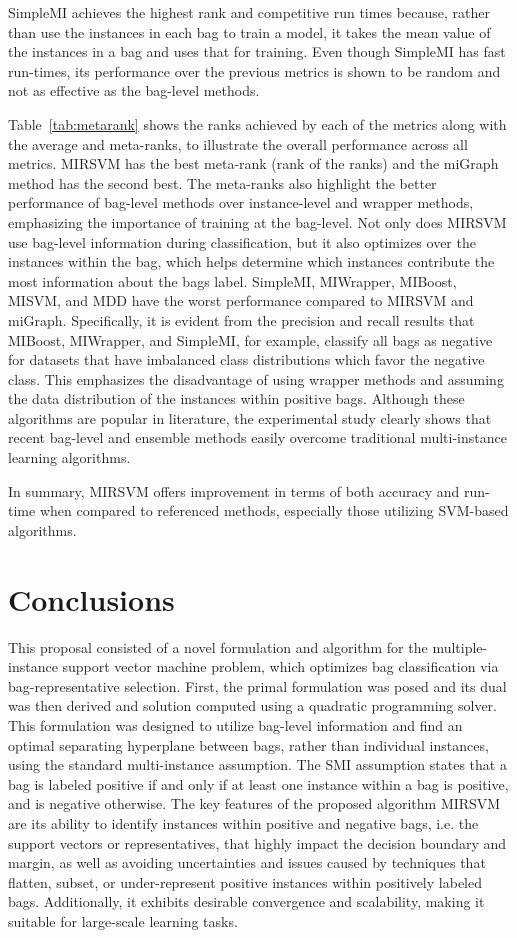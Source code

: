 \documentclass[reqno]{vcuthesis}
\numberwithin{equation}{chapter}
\begin{document}
SimpleMI achieves the highest rank and competitive run times because, rather than use the instances in each bag to train a model, it takes the mean value of the instances in a bag and uses that for training. Even though SimpleMI has fast run-times, its performance over the previous metrics is shown to be random and not as effective as the bag-level methods.

Table~\ref{tab:metarank} shows the ranks achieved by each of the metrics along with the average and meta-ranks, to illustrate the overall performance across all metrics. MIRSVM has the best meta-rank (rank of the ranks) and the miGraph method has the second best. The meta-ranks also highlight the better performance of bag-level methods over instance-level and wrapper methods, emphasizing the importance of training at the bag-level. Not only does MIRSVM use bag-level information during classification, but it also optimizes over the instances within the bag, which helps determine which instances contribute the most information about the bags label. SimpleMI, MIWrapper, MIBoost, MISVM, and MDD have the worst performance compared to MIRSVM and miGraph. Specifically, it is evident from the precision and recall results that MIBoost, MIWrapper, and SimpleMI, for example, classify all bags as negative for datasets that have imbalanced class distributions which favor the negative class. This emphasizes the disadvantage of using wrapper methods and assuming the data distribution of the instances within positive bags. Although these algorithms are popular in literature, the experimental study clearly shows that recent bag-level and ensemble methods easily overcome traditional multi-instance learning algorithms. 

In summary, MIRSVM offers improvement in terms of both accuracy and run-time when compared to referenced methods, especially those utilizing SVM-based algorithms.

\section{Conclusions}
This proposal consisted of a novel formulation and algorithm for the multiple-instance support vector machine problem, which optimizes bag classification via bag-representative selection. First, the primal formulation was posed and its dual was then derived and solution computed using a quadratic programming solver. This formulation was designed to utilize bag-level information and find an optimal separating hyperplane between bags, rather than individual instances, using the standard multi-instance assumption. The SMI assumption states that a bag is labeled positive if and only if at least one instance within a bag is positive, and is negative otherwise. The key features of the proposed algorithm MIRSVM are its ability to identify instances within positive and negative bags, i.e. the support vectors or representatives, that highly impact the decision boundary and margin, as well as avoiding uncertainties and issues caused by techniques that flatten, subset, or under-represent positive instances within positively labeled bags. Additionally, it exhibits desirable convergence and scalability, making it suitable for large-scale learning tasks.
\end{document}
